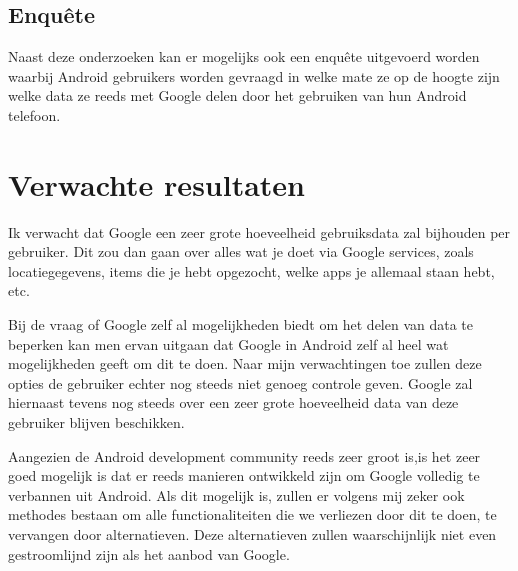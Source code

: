 \subsection{{Enquête}}

\noindent Naast deze onderzoeken kan er mogelijks ook een enquête uitgevoerd worden waarbij Android gebruikers worden gevraagd in welke mate ze op de hoogte zijn welke data ze reeds met Google delen door het gebruiken van hun Android telefoon.

\section{Verwachte resultaten}
\label{sec:verwachte_resultaten}

Ik verwacht dat Google een zeer grote hoeveelheid gebruiksdata zal bijhouden per gebruiker. Dit zou dan gaan over alles wat je doet via Google services, zoals locatiegegevens, items die je hebt opgezocht, welke apps je allemaal staan hebt, etc.

\vspace{3mm}

\noindent Bij de vraag of Google zelf al mogelijkheden biedt om het delen van data te beperken kan men ervan uitgaan dat Google in Android zelf al heel wat mogelijkheden geeft om dit te doen. Naar mijn verwachtingen toe zullen deze opties de gebruiker echter nog steeds niet genoeg controle geven. Google zal hiernaast tevens nog steeds over een zeer grote hoeveelheid data van deze gebruiker blijven beschikken.

\vspace{3mm}

\noindent Aangezien de Android development community reeds zeer groot is,is het zeer goed mogelijk is dat er reeds manieren ontwikkeld zijn om Google volledig te verbannen uit Android. Als dit mogelijk is, zullen er volgens mij zeker ook methodes bestaan om alle functionaliteiten die we verliezen door dit te doen, te vervangen door alternatieven. Deze alternatieven zullen waarschijnlijk niet even gestroomlijnd zijn als het aanbod van Google. 

\vspace{3mm}


